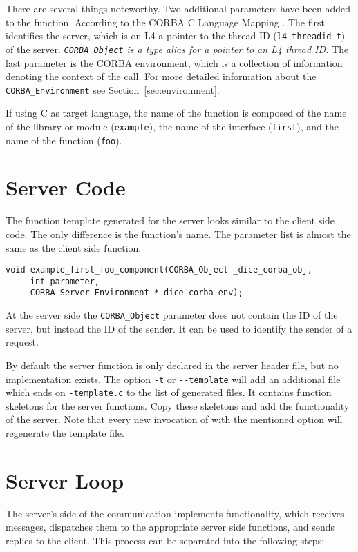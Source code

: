 There are several things noteworthy. Two additional parameters have been added
to the function. According to the CORBA C Language Mapping \cite{corba-clm}.
The first identifies the server, which is on L4 a pointer to the thread ID
(\verb|l4_threadid_t|) of the server.  {\em \verb|CORBA_Object| is a type
alias for a pointer to an L4 thread ID.} The last parameter is the CORBA
environment, which is a collection of information denoting the context of the
call. For more detailed information about the \verb|CORBA_Environment| see
Section~\ref{sec:environment}.

If using C as target language, the name of the function is composed of the
name of the library or module (\verb|example|), the name of the interface
(\verb|first|), and the name of the function (\verb|foo|).

\section{Server Code}
The function template generated for the server looks similar to the client
side code. The only difference is the function's name. The
parameter list is almost the same as the client side function.

\begin{verbatim}
void example_first_foo_component(CORBA_Object _dice_corba_obj,
     int parameter,
     CORBA_Server_Environment *_dice_corba_env);
\end{verbatim}

At the server side the \verb|CORBA_Object| parameter does not contain the ID
of the server, but instead the ID of the sender. It can be used to identify
the sender of a request.

By default the server function is only declared in the server header file, but
no implementation exists. The option \verb|-t| or \verb|--template| will add
an additional file which ends on \verb|-template.c| to the list of generated
files. It contains function skeletons for the server functions. Copy these
skeletons and add the functionality of the server. Note that every new
invocation of \dice{} with the mentioned option will regenerate the template
file.

\section{Server Loop}
The server's side of the communication implements
functionality, which receives messages, dispatches them to the
appropriate server side functions, and sends replies
to the client. This process can be separated into the
following steps:

